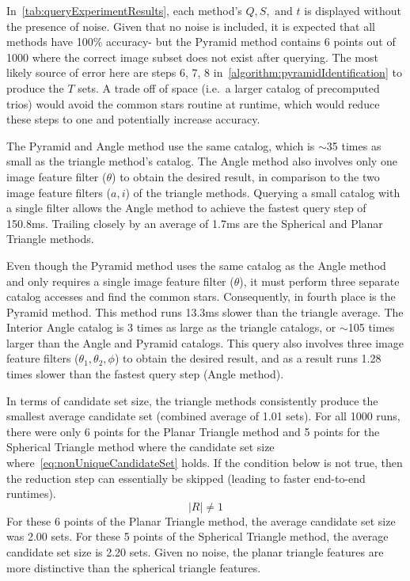 In~\autoref{tab:queryExperimentResults}, each method's $Q, S, \text{ and } t$ is displayed without the presence of
noise.
Given that no noise is included, it is expected that all methods have 100\% accuracy- but the Pyramid method contains
6 points out of 1000 where the correct image subset does not exist after querying.
The most likely source of error here are steps 6, 7, 8 in~\autoref{algorithm:pyramidIdentification} to produce the
$T$ sets.
A trade off of space (i.e.\ a larger catalog of precomputed trios) would avoid the common stars routine at runtime,
which would reduce these steps to one and potentially increase accuracy.

The Pyramid and Angle method use the same catalog, which is $\sim$35 times as small as the triangle method's catalog.
The Angle method also involves only one image feature filter ($\theta$) to obtain the desired result, in comparison
to the two image feature filters ($a, i$) of the triangle methods.
Querying a small catalog with a single filter allows the Angle method to achieve the fastest query step of 150.8ms.
Trailing closely by an average of 1.7ms are the Spherical and Planar Triangle methods.

Even though the Pyramid method uses the same catalog as the Angle method and only requires a single image feature
filter ($\theta$), it must perform three separate catalog accesses and find the common stars.
Consequently, in fourth place is the Pyramid method.
This method runs 13.3ms slower than the triangle average.
The Interior Angle catalog is 3 times as large as the triangle catalogs, or $\sim$105 times larger than the Angle and Pyramid
catalogs.
This query also involves three image feature filters ($\theta_1, \theta_2, \phi$) to obtain the desired result, and
as a result runs 1.28 times slower than the fastest query step (Angle method).

In terms of candidate set size, the triangle methods consistently produce the smallest average candidate set
(combined average of 1.01 sets).
For all 1000 runs, there were only 6 points for the Planar Triangle method and 5 points for the Spherical Triangle
method where the candidate set size where~\autoref{eq:nonUniqueCandidateSet} holds.
If the condition below is not true, then the reduction step can essentially be skipped (leading to faster end-to-end
runtimes).
\begin{equation}\label{eq:nonUniqueCandidateSet}
    |R| \neq 1
\end{equation}
For these 6 points of the Planar Triangle method, the average candidate set size was 2.00 sets.
For these 5 points of the Spherical Triangle method, the average candidate set size is 2.20 sets.
Given no noise, the planar triangle features are more distinctive than the spherical triangle features.

